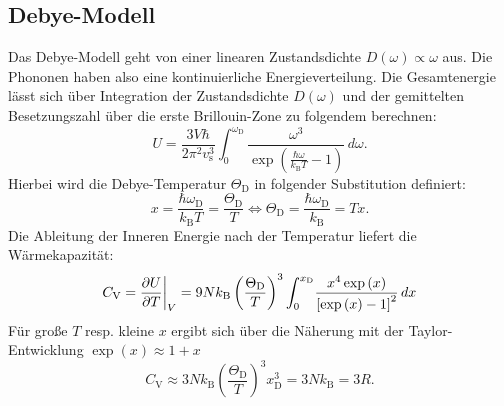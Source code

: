 \subsection{Debye-Modell}
Das Debye-Modell geht von einer linearen Zustandsdichte $D(\omega) \propto \omega$ aus.
Die Phononen haben also eine kontinuierliche Energieverteilung.
Die Gesamtenergie lässt sich über Integration der Zustandsdichte $D(\omega)$ und der gemittelten Besetzungszahl über die erste Brillouin-Zone zu folgendem berechnen:
\begin{equation*}
	U = \frac{3 V \hbar}{2 \pi^2 v_{\text{s}}^3} \int_{0}^{\omega_{\text{D}}} \! \frac{ \omega^3 }{ \exp{ \left(  \frac{\hbar \omega}{k_{\text{B}} T} - 1  \right)} } \, d\omega.
\end{equation*}
Hierbei wird die Debye-Temperatur $\Theta_{\text{D}}$ in folgender Substitution definiert:
\begin{equation*}
	x = \frac{\hbar \omega_{\text{D}}}{k_{\text{B}} T} = \frac{\Theta_{\text{D}}}{T} \Leftrightarrow  \Theta_{\text{D}} = \frac{\hbar \omega_{\text{D}}}{k_{\text{B}}} = T x.
\end{equation*}
Die Ableitung der Inneren Energie nach der Temperatur liefert die Wärmekapazität:
\begin{equation*}
	C_{\text{V}} = \frac{\partial U}{\partial T} \bigg{\vert}_{V} = 9 N k_{\text{B}} \left( \frac{\Theta_{\text{D}}}{T} \right)^3 \int_{0}^{x_{\text{D}}} \! \frac{ x^4 \exp{(x)}}{ \left[ \exp{ (x) } - 1  \right]^2}  \, dx
\end{equation*}
Für große $T$ resp. kleine $x$ ergibt sich über die Näherung mit der Taylor-Entwicklung $\exp(x) \approx 1 + x $
\begin{equation*}
	C_{\text{V}} \approx 3 N k_{\text{B}} \left( \frac{\Theta_{\text{D}}}{T} \right)^3 x_{\text{D}}^3= 3 N k_{\text{B}} = 3 R.
\end{equation*}
\FloatBarrier
